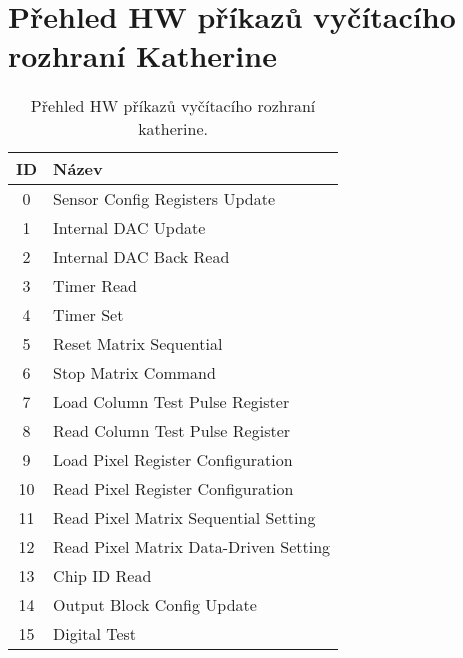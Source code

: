 \section{Přehled HW příkazů vyčítacího rozhraní Katherine}\label{chap:app:katherine:hw_commands}
\begin{table}[h]
	\begin{center}
		\begin{tabular}{|c|l|}
			\hline
            \textbf{ID} & \textbf{Název} \\
			\hline
            0 & Sensor Config Registers Update \\
            1 & Internal DAC Update \\
            2 & Internal DAC Back Read \\
            3 & Timer Read \\
            4 & Timer Set \\
            5 & Reset Matrix Sequential \\
            6 & Stop Matrix Command \\
            7 & Load Column Test Pulse Register \\
            8 & Read Column Test Pulse Register \\
            9 & Load Pixel Register Configuration \\
            10 & Read Pixel Register Configuration \\
            11 & Read Pixel Matrix Sequential Setting \\
            12 & Read Pixel Matrix Data-Driven Setting \\
            13 & Chip ID Read \\
            14 & Output Block Config Update \\
            15 & Digital Test \\
			\hline
		\end{tabular}
	\end{center}
	\caption{Přehled HW příkazů vyčítacího rozhraní katherine.}
	\label{tab:app:hw_commands}
\end{table}

